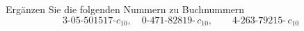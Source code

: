 \begin{aufgabe}
Ergänzen Sie die folgenden Nummern zu Buchnummern
\[
\text{3-05-501517-}c_{10},\quad \text{0-471-82819-}\,c_{10},\qquad \text{4-263-79215-}\,c_{10}
\]
\end{aufgabe}
